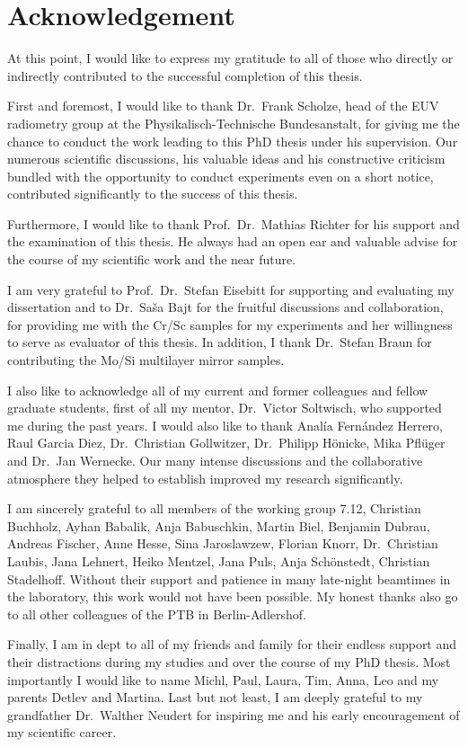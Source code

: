 \pagestyle{empty}
\noindent
\section*{Acknowledgement}
At this point, I would like to express my gratitude to all of those who directly or indirectly contributed to the successful completion of this thesis.

First and foremost, I would like to thank Dr.~Frank Scholze, head of the EUV radiometry group at the Physikalisch-Technische Bundesanstalt, for giving me the chance to conduct the work leading to this PhD thesis under his supervision. Our numerous scientific discussions, his valuable ideas and his constructive criticism bundled with the opportunity to conduct experiments even on a short notice, contributed significantly to the success of this thesis.

Furthermore, I would like to thank Prof.~Dr.~Mathias Richter for his support and the examination of this thesis. He always had an open ear and valuable advise for the course of my scientific work and the near future. 

I am very grateful to Prof.~Dr.~Stefan Eisebitt for supporting and evaluating my dissertation and to Dr.~Sa\v{s}a Bajt for the fruitful discussions and collaboration, for providing me with the Cr/Sc samples for my experiments and her willingness to serve as evaluator of this thesis. In addition, I thank Dr.~Stefan Braun for contributing the Mo/Si multilayer mirror samples.

I also like to acknowledge all of my current and former colleagues and fellow graduate students, first of all my mentor, Dr.~Victor Soltwisch, who supported me during the past years. I would also like to thank Anal\'{i}a Fern\'{a}ndez Herrero, Raul Garcia Diez, Dr.~Christian Gollwitzer, Dr.~Philipp Hönicke, Mika Pflüger and Dr.~Jan Wernecke. Our many intense discussions and the collaborative atmosphere they helped to establish improved my research significantly.

I am sincerely grateful to all members of the working group 7.12, Christian Buchholz, Ayhan Babalik, Anja Babuschkin, Martin Biel, Benjamin Dubrau, Andreas Fischer, Anne Hesse, Sina Jaroslawzew, Florian Knorr, Dr.~Christian Laubis, Jana Lehnert, Heiko Mentzel, Jana Puls, Anja Schönstedt, Christian Stadelhoff. Without their support and patience in many late-night beamtimes in the laboratory, this work would not have been possible. My honest thanks also go to all other colleagues of the PTB in Berlin-Adlershof.

Finally, I am in dept to all of my friends and family for their endless support and their distractions during my studies and over the course of my PhD thesis. Most importantly I would like to name Michl, Paul, Laura, Tim, Anna, Leo and my parents Detlev and Martina. Last but not least, I am deeply grateful to my grandfather Dr.~Walther Neudert for inspiring me and his early encouragement of my scientific career.








\cleardoublepage
